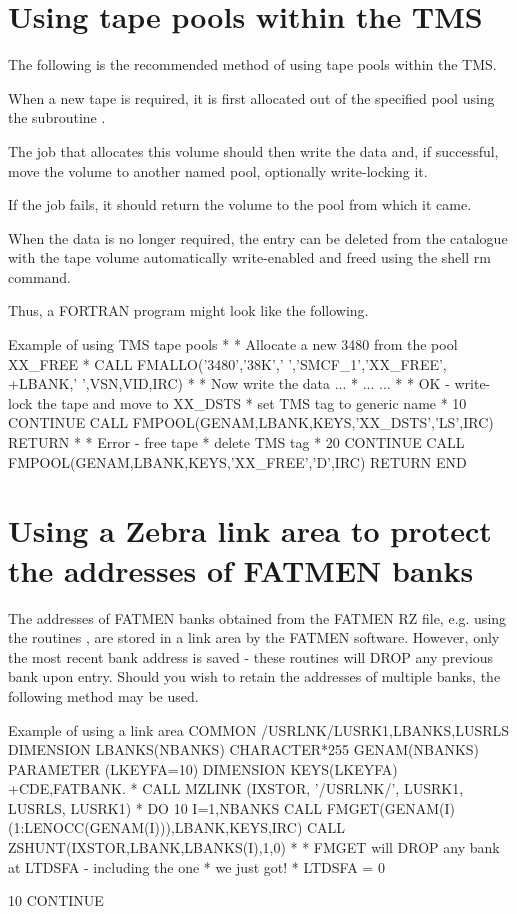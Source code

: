 \section{Using tape pools within the TMS}
\par
The following is the recommended method of using tape pools
within the TMS.
\begin{UL}
\item
When a new tape is required, it is first allocated out of the
specified pool using the subroutine .
\item
The job that allocates this volume should then write the data and,
if successful, move the volume to another named pool, optionally
write-locking it.
\item
If the job fails, it should return the volume to the pool from which
it came.
\item
When the data is no longer required, the entry can be deleted from
the catalogue with the tape volume automatically write-enabled
and freed using the shell rm command.
\end{UL} 
\par
Thus, a FORTRAN program might look like the following.
\begin{XMPt}{Example of using TMS tape pools}
*
*     Allocate a new 3480 from the pool XX_FREE
*
      CALL FMALLO('3480','38K',' ','SMCF_1','XX_FREE',
     +LBANK,' ',VSN,VID,IRC)
*
*     Now write the data ...
*
...
...      
*
*     OK - write-lock the tape and move to XX_DSTS
*     set TMS tag to generic name
*
10    CONTINUE
      CALL FMPOOL(GENAM,LBANK,KEYS,'XX_DSTS','LS',IRC)
      RETURN
*
*     Error - free tape
*     delete TMS tag 
*
20    CONTINUE
      CALL FMPOOL(GENAM,LBANK,KEYS,'XX_FREE','D',IRC)
      RETURN
      END
\end{XMPt}
\section{Using a Zebra link area to protect the addresses of FATMEN banks}
\label{LAREA}
\par
The addresses of FATMEN banks obtained from the FATMEN RZ file, e.g.
using the routines ,  are stored in a link area by the
FATMEN software. However, only the most recent bank address is saved -
these routines will DROP any previous bank upon entry.
Should you wish to retain the addresses of multiple banks, the
following method may be used.
\begin{XMPt}{Example of using a link area}
      COMMON /USRLNK/LUSRK1,LBANKS,LUSRLS
      DIMENSION LBANKS(NBANKS)
      CHARACTER*255 GENAM(NBANKS)
      PARAMETER (LKEYFA=10)
      DIMENSION KEYS(LKEYFA)
+CDE,FATBANK.
*
      CALL MZLINK (IXSTOR, '/USRLNK/', LUSRK1, LUSRLS, LUSRK1)
*
      DO 10 I=1,NBANKS
      CALL FMGET(GENAM(I)(1:LENOCC(GENAM(I))),LBANK,KEYS,IRC)
      CALL ZSHUNT(IXSTOR,LBANK,LBANKS(I),1,0)
*
*     FMGET will DROP any bank at LTDSFA - including the one
*     we just got!
*
      LTDSFA = 0
 
10    CONTINUE
\end{XMPt}
